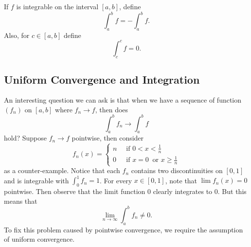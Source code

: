 \begin{tcolorbox}
\begin{defn}
	If \( f  \) is integrable on the interval \( [a,b]  \), define 
	\[  \int_{ a }^{ b } f = - \int_{ a }^{b  } f. \]
	Also, for \( c \in [a,b]  \) define 
	\[  \int_{ c }^{ c } f = 0. \]
\end{defn}
\end{tcolorbox}

\subsection{Uniform Convergence and Integration}

An interesting question we can ask is that when we have a sequence of function \( (f_{n}) \) on \( [a,b]  \) where \( f_{n} \to f  \), then does 
\[  \int_{ a }^{ b } f_{n} \to \int_{ a }^{ b } f  \]
hold? Suppose \( f_{n} \to f  \) pointwise, then consider 
\[  f_{n}(x) = 
\begin{cases}
	n \ &\text{ if } 0 < x < \frac{ 1 }{ n } \\
	0 \ &\text{ if } x = 0 \ \text{ or } x \geq \frac{ 1 }{ n }
\end{cases} \]
as a counter-example. Notice that each \( f_{n} \) contains two discontinuities on \( [0,1] \) and is integrable with \( \int_{ 0 }^{ 1 } f_{n} = 1  \). For every \( x \in [0,1] \), note that \( \lim f_{n}(x) = 0  \) pointwise.  Then observe that the limit function \( 0  \) clearly integrates to \( 0 \). But this means that 
\[  \lim_{ n \to \infty  }  \int_{ a }^{ b } f_{n} \neq 0. \]
To fix this problem caused by pointwise convergence, we require the assumption of uniform convergence. 


